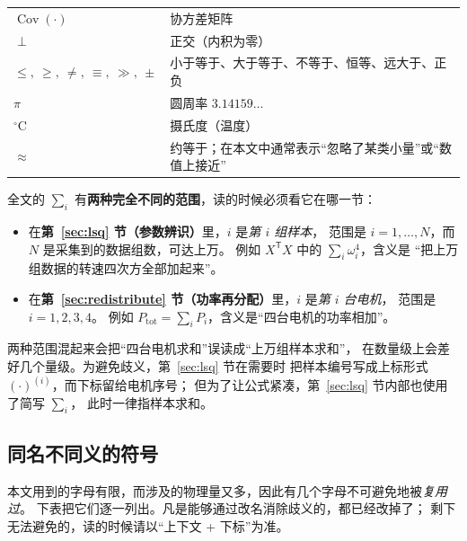\documentclass[cn,blue,11pt,device=normal]{elegantnote}
\begin{document}
\begin{table}[htbp]
\begin{tabular}{@{}>{\raggedright\arraybackslash}p{}>{\raggedright\arraybackslash}p{}@{}}
    $\operatorname{Cov}(\cdot)$ & 协方差矩阵 \\
    $\perp$          & 正交（内积为零） \\
    $\le,\ \ge,\ \ne,\ \equiv,\ \gg,\ \pm$ & 小于等于、大于等于、不等于、恒等、远大于、正负 \\
    $\pi$            & 圆周率 $3.14159\ldots$ \\
    ${}^{\circ}\mathrm{C}$ & 摄氏度（温度） \\
    $\approx$ & 约等于；在本文中通常表示“忽略了某类小量”或“数值上接近” \\
    \bottomrule
  \end{tabular}
\end{table}

\begin{remark}
全文的 $\sum_i$ 有\textbf{两种完全不同的范围}，读的时候必须看它在哪一节：

\begin{itemize}
  \item 在\textbf{第~\ref{sec:lsq} 节（参数辨识）}里，$i$ 是\emph{第 $i$ 组样本}，
  范围是 $i=1,\dots,N$，而 $N$ 是采集到的数据组数，可达上万。
  例如 $X^{\mathsf T}X$ 中的 $\sum_i \omega_i^{4}$，含义是
  “把上万组数据的转速四次方全部加起来”。
  \item 在\textbf{第~\ref{sec:redistribute} 节（功率再分配）}里，$i$ 是\emph{第 $i$ 台电机}，
  范围是 $i=1,2,3,4$。
  例如 $P_{\mathrm{tot}}=\sum_i P_i$，含义是“四台电机的功率相加”。
\end{itemize}

两种范围混起来会把“四台电机求和”误读成“上万组样本求和”，
在数量级上会差好几个量级。为避免歧义，第~\ref{sec:lsq} 节在需要时
把样本编号写成上标形式 $(\cdot)^{(i)}$，而下标留给电机序号；
但为了让公式紧凑，第~\ref{sec:lsq} 节内部也使用了简写 $\sum_i$，
此时一律指样本求和。
\end{remark}

\subsection{同名不同义的符号}

本文用到的字母有限，而涉及的物理量又多，因此有几个字母不可避免地被\emph{复用过}。
下表把它们逐一列出。凡是能够通过改名消除歧义的，都已经改掉了；
剩下无法避免的，读的时候请以“上下文 + 下标”为准。
\end{document}
